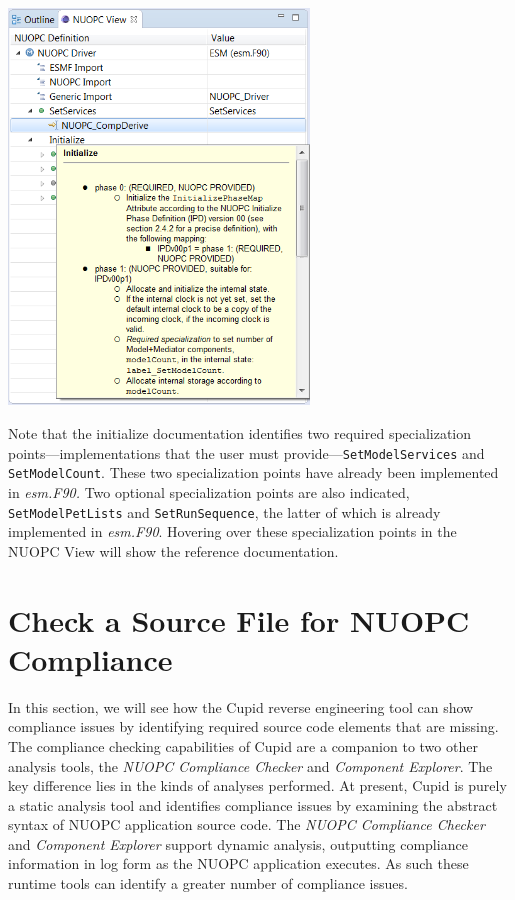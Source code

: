 \documentclass[oneside,11pt]{memoir}
\begin{document}
\begin{enumerate}
\vspace{24pt}
\parbox{\linewidth}{\centering
  \includegraphics[width=8cm]{figs/reveng_fig6.png}
}
\vspace{24pt}

Note that the initialize documentation identifies two required specialization points---implementations that the user must provide---\texttt{SetModelServices} and \texttt{SetModelCount}.  These two specialization points have already been implemented in \emph{esm.F90.}  Two optional specialization points are also indicated, \texttt{SetModelPetLists} and \texttt{SetRunSequence}, the latter of which is already implemented in \emph{esm.F90}. Hovering over these specialization points in the NUOPC View will show the reference documentation.


\end{enumerate}

\section{Check a Source File for NUOPC Compliance}

In this section, we will see how the Cupid reverse engineering tool can show compliance issues by identifying required source code elements that are missing.  The compliance checking capabilities of Cupid are a companion to two other analysis tools, the \emph{NUOPC Compliance Checker} and \emph{Component Explorer}. The key difference lies in the kinds of analyses performed. At present, Cupid is purely a static analysis tool and identifies compliance issues by examining the abstract syntax of NUOPC application source code. The \emph{NUOPC Compliance Checker} and \emph{Component Explorer} support dynamic analysis, outputting compliance information in log form as the NUOPC application executes.  As such these runtime tools can identify a greater number of compliance issues.  
\end{document}

